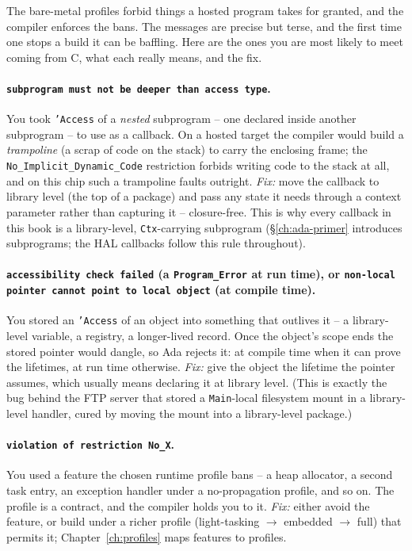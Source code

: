 The bare-metal profiles forbid things a hosted program takes for granted, and the
compiler enforces the bans. The messages are precise but terse, and the first time
one stops a build it can be baffling. Here are the ones you are most likely to meet
coming from C, what each really means, and the fix.

\paragraph{\texttt{subprogram must not be deeper than access type}.}
You took \texttt{'Access} of a \emph{nested} subprogram -- one declared inside
another subprogram -- to use as a callback. On a hosted target the compiler would
build a \emph{trampoline} (a scrap of code on the stack) to carry the enclosing
frame; the \texttt{No\_Implicit\_Dynamic\_Code} restriction forbids writing code to
the stack at all, and on this chip such a trampoline faults outright. \emph{Fix:}
move the callback to library level (the top of a package) and pass any state it
needs through a context parameter rather than capturing it -- closure-free. This is
why every callback in this book is a library-level, \texttt{Ctx}-carrying
subprogram (\S\ref{ch:ada-primer} introduces subprograms; the HAL callbacks follow
this rule throughout).

\paragraph{\texttt{accessibility check failed} (a \texttt{Program\_Error} at run
time), or \texttt{non-local pointer cannot point to local object} (at compile
time).} You stored an \texttt{'Access} of an object into something that outlives it
-- a library-level variable, a registry, a longer-lived record. Once the object's
scope ends the stored pointer would dangle, so Ada rejects it: at compile time when
it can prove the lifetimes, at run time otherwise. \emph{Fix:} give the object the
lifetime the pointer assumes, which usually means declaring it at library level.
(This is exactly the bug behind the FTP server that stored a \texttt{Main}-local
filesystem mount in a library-level handler, cured by moving the mount into a
library-level package.)

\paragraph{\texttt{violation of restriction No\_X}.}
You used a feature the chosen runtime profile bans -- a heap allocator, a second
task entry, an exception handler under a no-propagation profile, and so on. The
profile is a contract, and the compiler holds you to it. \emph{Fix:} either avoid
the feature, or build under a richer profile (light-tasking $\rightarrow$ embedded
$\rightarrow$ full) that permits it; Chapter~\ref{ch:profiles} maps features to
profiles.

